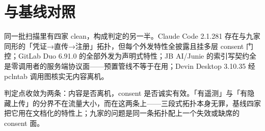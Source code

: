 \section{与基线对照}

同一批扫描里有四家 clean，构成判定的另一半。Claude Code 2.1.281 存在与九家同形的「凭证→直传→注册」拓扑，但每个外发特性全披露且挂多层 consent 门控；GitLab Duo 6.91.0 的全部外发为声明式特性；JB AI/Junie 的索引写契约全是零调用者的服务端协议面——预置管线不等于在用；Devin Desktop 3.10.35 经 pclntab 调用图核实无内容离机。

判定点收敛为两条：内容是否离机，consent 是否诚实有效。「有遥测」与「有隐藏上传」的分界不在流量大小，而在这两条上——三段式拓扑本身无罪，基线四家把它用在文档化的特性上；九家的问题是同一条拓扑配上一个失效或缺席的 consent 面。

